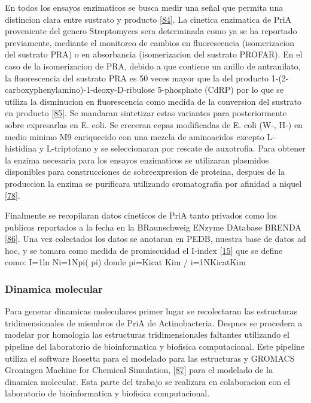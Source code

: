 \documentclass[12pt,twoside]{reedthesis}
\begin{document}
  En todos los ensayos enzimaticos se busca medir una señal que permita
  una distincion clara entre sustrato y producto
  {[}\protect\hyperlink{ref-bisswangerux5fgeneralux5f2011}{84}{]}. La
  cinetica enzimatica de PriA proveniente del genero Streptomyces sera
  determinada como ya se ha reportado previamente, mediante el monitoreo
  de cambios en fluorescencia (isomerizacion del sustrato PRA) o en
  absorbancia (isomerizacion del sustrato PROFAR). En el caso de la
  isomerizacion de PRA, debido a que contiene un anillo de antranilato, la
  fluorescencia del sustrato PRA es 50 veces mayor que la del producto
  1-(2-carboxyphenylamino)-1-deoxy-D-ribulose 5-phosphate (CdRP) por lo
  que se utiliza la disminucion en fluorescencia como medida de la
  conversion del sustrato en producto
  {[}\protect\hyperlink{ref-hommelux5fphosphoribosylux5f1995}{85}{]}. Se
  mandaran sintetizar estas variantes para posteriormente sobre
  expresarlas en E. coli. Se creceran cepas modificadas de E. coli (W-,
  H-) en medio minimo M9 enriquecido con una mezcla de aminoacidos excepto
  L-histidina y L-triptofano y se seleccionaran por rescate de auxotrofia.
  Para obtener la enzima necesaria para los ensayos enzimaticos se
  utilizaran plasmidos disponibles para construcciones de sobreexpresion
  de proteina, despues de la produccion la enzima se purificara utilizando
  cromatografia por afinidad a niquel
  {[}\protect\hyperlink{ref-verduzco-castroux5fco-occurrenceux5f2016}{78}{]}.
  
  Finalmente se recopilaran datos cineticos de PriA tanto privados como
  los publicos reportados a la fecha en la BRaunschweig ENzyme DAtabase
  BRENDA {[}\protect\hyperlink{ref-scheerux5fbrendaux5f2011}{86}{]}. Una
  vez colectados los datos se anotaran en PEDB, nuestra base de datos ad
  hoc, y se tomara como medida de promiscuidad el I-index
  {[}\protect\hyperlink{ref-nathux5fquantitativeux5f2008}{15}{]} que se
  define como: I=1ln Ni=1Npi( pi) donde pi=Kicat Kim / i=1NKicatKim
  
  \subsubsection{Dinamica molecular}\label{dinamica-molecular}
  
  Para generar dinamicas moleculares primer lugar se recolectaran las
  estructuras tridimensionales de miembros de PriA de Actinobacteria.
  Despues se procedera a modelar por homologia las estructuras
  tridimensionales faltantes utilizando el pipeline del laboratorio de
  bioinformatica y biofisica computacional. Este pipeline utiliza el
  software Rosetta para el modelado para las estructuras y GROMACS
  Groningen Machine for Chemical Simulation,
  {[}\protect\hyperlink{ref-vanux5fderux5fspoelux5fgromacsux5f2005}{87}{]}
  para el modelado de la dinamica molecular. Esta parte del trabajo se
  realizara en colaboracion con el laboratorio de bioinformatica y
  biofisica computacional.
  
\end{document}
